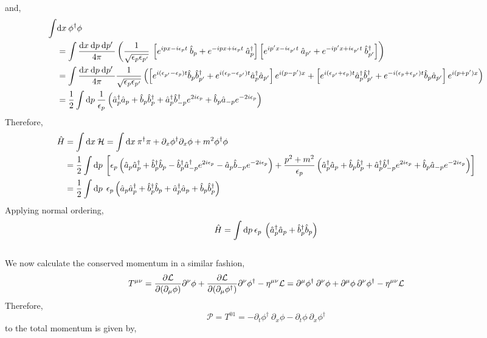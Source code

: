 \documentclass[12pt]{extarticle}
\begin{document}
and,
\begin{align*}
\int & \mathrm{d}x \: \phi^\dagger \phi
\\
& = \int \frac{\mathrm{d}x \: \mathrm{d}p \: \mathrm{d}p' \:}{4 \pi} \left( \frac{1}{\sqrt{\epsilon_p \epsilon_{p'}}} \: \left[ e^{i p x - i \epsilon_p t} \: \hat{b}_p + e^{- i p x + i \epsilon_p t} \: \hat{a}^\dagger_p \right] \left[e^{i p' x - i \epsilon_{p'} t} \: \hat{a}_{p'} + e^{- i p' x + i \epsilon_{p'} t} \: \hat{b}^\dagger_{p'} \right]   \right) 
\\ 
& = \int \frac{\mathrm{d}x \: \mathrm{d}p \: \mathrm{d}p' \:}{4 \pi} \frac{1}{\sqrt{\epsilon_p \epsilon_{p'}}}  \left( \left[e^{i (\epsilon_{p'} - \epsilon_p) t} \hat{b}_p \hat{b}^\dagger_{p'} + e^{i (\epsilon_p - \epsilon_{p'}) t} \hat{a}^\dagger_p \hat{a}_{p'} \right] e^{i (p - p') x} +
\left[e^{i (\epsilon_{p'} + \epsilon_p) t} \hat{a}^\dagger_p \hat{b}^\dagger_{p'} + e^{-i (\epsilon_p + \epsilon_{p'}) t} \hat{b}_p \hat{a}_{p'} \right] e^{i (p + p') x} \right)
\\
& = \frac{1}{2} \int \mathrm{d}p \: \frac{1}{\epsilon_p} \left(\hat{a}^\dagger_p \hat{a}_{p} + \hat{b}_p \hat{b}^\dagger_{p} +
\hat{a}^\dagger_p \hat{b}^\dagger_{-p} e^{2 i \epsilon_p} + \hat{b}_p \hat{a}_{-p} e^{-2 i \epsilon_p} \right)
\end{align*}
Therefore,
\begin{align*}
\hat{H} & = \int \mathrm{d}x \: \mathcal{H} = \int \mathrm{d}x \: \pi^\dagger \pi + \partial_x \phi^\dagger \partial_x \phi + m^2 \phi^\dagger \phi 
\\
& = \frac{1}{2} \int \mathrm{d}p \: \left[ \epsilon_p \left(\hat{a}_p \hat{a}^\dagger_{p} + \hat{b}^\dagger_p \hat{b}_{p} -
\hat{b}^\dagger_p \hat{a}^\dagger_{-p} e^{2 i \epsilon_p} - \hat{a}_p \hat{b}_{-p} e^{-2 i \epsilon_p} \right) + \frac{p^2 + m^2}{\epsilon_p} \left(\hat{a}^\dagger_p \hat{a}_{p} + \hat{b}_p \hat{b}^\dagger_{p} +
\hat{a}^\dagger_p \hat{b}^\dagger_{-p} e^{2 i \epsilon_p} + \hat{b}_p \hat{a}_{-p} e^{-2 i \epsilon_p} \right) \right]
\\
& = \frac{1}{2} \int \mathrm{d}p \: \: \epsilon_p \left(\hat{a}_p \hat{a}^\dagger_{p} + \hat{b}^\dagger_p \hat{b}_{p} + \hat{a}^\dagger_p \hat{a}_{p} + \hat{b}_p \hat{b}^\dagger_{p} \right)
\end{align*}
Applying normal ordering,
\[ \hat{H} = \int \mathrm{d}p \: \epsilon_p \: \left( \hat{a}^\dagger_p \hat{a}_p + \hat{b}^\dagger_p \hat{b}_p \right)\]
\bigskip \\
We now calculate the conserved momentum in a similar fashion,
\[ T^{\mu \nu} = \frac{\partial{\mathcal{L}}}{\partial{(\partial_\mu \phi)}} \partial^\nu \phi + \frac{\partial{\mathcal{L}}}{\partial{(\partial_\mu \phi^\dagger)}} \partial^\nu \phi^\dagger - \eta^{\mu \nu} \mathcal{L}  = \partial^\mu \phi^\dagger \: \partial^\nu \phi + \partial^\mu \phi \: \partial^\nu \phi^\dagger - \eta^{\mu \nu} \mathcal{L} \]
Therefore,
\[ \mathcal{P} = T^{01} = - \partial_t \phi^\dagger \: \partial_x \phi - \partial_t \phi \: \partial_x \phi^\dagger \] 
to the total momentum is given by,
\end{document}
